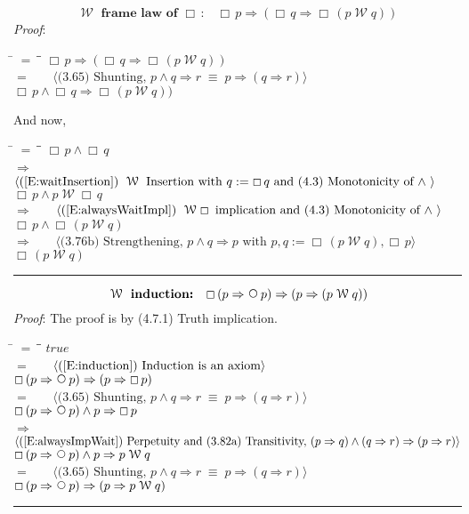 \documentclass[12pt, fleqn, leqno]{article}
\newcommand{\lgap}{2pt}                             %
\newcommand{\mymathindent}{24pt}                    %
\newcommand{\equivs}{\ensuremath{\;\equiv\;}}       %
\newcommand{\impl}{\ensuremath{\Rightarrow}}        %
\newcommand{\Wait}{\;\mathcal{W}\;}
\newcommand{\Next}{\;\,\text{\raisebox{3.5pt}{\circle{6}}}}
\newcommand{\Always}{\Box\,}
\newcommand{\myqed}{\rule[-.23ex]{1.2ex}{2.0ex}}
\newcommand{\myqedtab}{\hspace{384pt}}              %
\newcommand{\Gll} {\langle}                         %
\newcommand{\Ggg} {\rangle}                         %
\newcommand{\Hint}[1]     {\ \ \ $\Gll              \mbox{#1} \Ggg$ }   %
\begin{document}
\begin{equation}\label{E:waitframelawAlways}
\textbf{$\Wait$ frame law of $\Always$:}\quad \Always p \impl (\Always q \impl \Always (p \Wait q))
\end{equation}
\emph{Proof}:
\begin{tabbing}
\hspace{\mymathindent} \= $= \;$ \= \myqedtab \= \kill
  \> \>   $\Always p \impl (\Always q \impl \Always (p \Wait q))$\\[\lgap]
  \> $=$  \>  \Hint{(3.65) Shunting, $p\land q\impl r\equivs p\impl (q\impl r)$}\\[\lgap]
  \> \>   $\Always p \land \Always q \impl \Always (p \Wait q))$
\end{tabbing}
And now,
\begin{tabbing}
\hspace{\mymathindent} \= $= \;$ \= \myqedtab \= \kill
  \> \>   $\Always p \land \Always q $\\[\lgap]
  \> $\impl$ \> \Hint{(\ref{E:waitInsertion}) $\Wait$ Insertion with $q:=\Always q$ and (4.3) Monotonicity of $\land$ } \\[\lgap]
  \> \>   $\Always p \land p \Wait \Always q $\\[\lgap]
   \> $\impl$ \> \Hint{(\ref{E:alwaysWaitImpl}) $\Wait\Always$ implication and (4.3) Monotonicity of $\land$  } \\[\lgap]
   \> \>   $\Always p \land \Always (p \Wait  q) $\\[\lgap]
  \> $\impl$ \> \Hint{(3.76b) Strengthening, $p\land q \impl p$ with $p,q := \Always (p \Wait q), \Always p$} \\[\lgap]
  \> \>   $\Always (p \Wait q) $\quad \myqed
\end{tabbing}
\begin{equation}\label{E:waitInduct1}
\textbf{$\Wait$ induction:}\quad \Always (p \impl \Next p) \impl  (p \impl (p \Wait q))
\end{equation}
\emph{Proof}: The proof is by (4.7.1) Truth implication.
\begin{tabbing}
\hspace{\mymathindent} \= $= \;$ \= \myqedtab \= \kill
  \> \>   $true$\\[\lgap]
  \> $=$  \>  \Hint{(\ref{E:induction}) Induction is an axiom}\\[\lgap]
  \> \>   $\Always (p \impl \Next p) \impl (p \impl \Always p)$\\[\lgap]
    \> $=$  \>  \Hint{(3.65) Shunting, $p\land q\impl r\equivs p\impl (q\impl r)$}\\[\lgap]
    \> \>   $\Always (p \impl \Next p) \land p \impl  \Always p$\\[\lgap]
  \> $\impl$  \>  \Hint{(\ref{E:alwaysImpWait}) Perpetuity and (3.82a) Transitivity, $(p\impl q) \land (q\impl r) \impl (p\impl r)$}\\[\lgap]
   \> \>   $\Always (p \impl \Next p) \land p \impl  p \Wait q$\\[\lgap]
    \> $=$  \>  \Hint{(3.65) Shunting, $p\land q\impl r\equivs p\impl (q\impl r)$}\\[\lgap]
  \> \>   $\Always (p \impl \Next p) \impl (p \impl p \Wait q)$ \quad \myqed
\end{tabbing}
\end{document}
